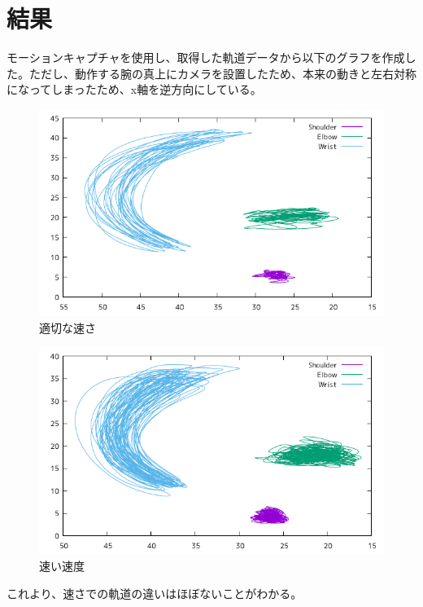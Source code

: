 \documentclass{jsarticle}
\begin{document}
\section{結果}
モーションキャプチャを使用し、取得した軌道データから以下のグラフを作成した。ただし、動作する腕の真上にカメラを設置したため、本来の動きと左右対称になってしまったため、x軸を逆方向にしている。
\begin{figure}[h]
  \begin{center}
    \includegraphics[clip,width=150mm]{Graph_2.png}
    \caption{適切な速さ}
  \end{center}
\end{figure}
\begin{figure}[h]
  \begin{center}
    \includegraphics[clip,width=150mm]{Graph_3.png}
    \caption{速い速度}
  \end{center}
\end{figure}

これより、速さでの軌道の違いはほぼないことがわかる。
\end{document}
